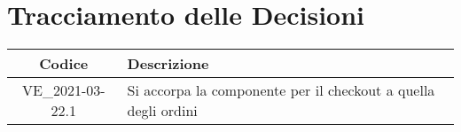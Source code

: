 \section*{Tracciamento delle Decisioni}

\begin{center}
	\begin{longtable}{|c|p{13cm}|}
	\hline
	\rowcolor{lighter-grayer}
	\textbf{Codice} & \textbf{Descrizione} \\
	\hline
	\endfirsthead
	\hline
	VE\_2021-03-22.1 & Si accorpa la componente per il checkout a quella degli ordini \\
	\hline

	\end{longtable}
\end{center}

